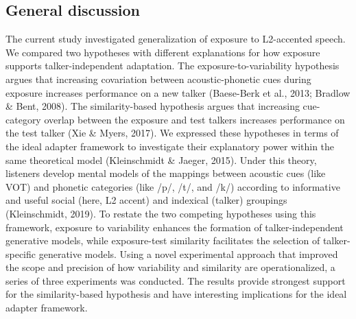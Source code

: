 \documentclass[
  12pt,
  twoside]{article}
\begin{document}
\hypertarget{discuss-study1}{%
\subsection{General discussion}\label{discuss-study1}}

The current study investigated generalization of exposure to L2-accented speech.
We compared two hypotheses with different explanations for how exposure supports talker-independent adaptation.
The exposure-to-variability hypothesis argues that increasing covariation between acoustic-phonetic cues during exposure increases performance on a new talker (Baese-Berk et al., 2013; Bradlow \& Bent, 2008).
The similarity-based hypothesis argues that increasing cue-category overlap between the exposure and test talkers increases performance on the test talker (Xie \& Myers, 2017).
We expressed these hypotheses in terms of the ideal adapter framework to investigate their explanatory power within the same theoretical model (Kleinschmidt \& Jaeger, 2015).
Under this theory, listeners develop mental models of the mappings between acoustic cues (like VOT) and phonetic categories (like /p/, /t/, and /k/) according to informative and useful social (here, L2 accent) and indexical (talker) groupings (Kleinschmidt, 2019).
To restate the two competing hypotheses using this framework, exposure to variability enhances the formation of talker-independent generative models, while exposure-test similarity facilitates the selection of talker-specific generative models.
Using a novel experimental approach that improved the scope and precision of how variability and similarity are operationalized, a series of three experiments was conducted.
The results provide strongest support for the similarity-based hypothesis and have interesting implications for the ideal adapter framework.
\end{document}
